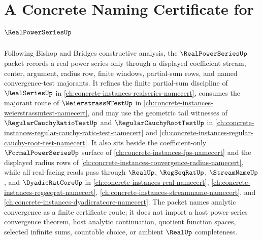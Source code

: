 \chapter{A Concrete Naming Certificate for $\RealPowerSeriesUp$}
\label{ch:concrete-instances-realpowerseries-namecert}

Following Bishop and Bridges constructive analysis, the $\RealPowerSeriesUp$ packet records a real power series only through a displayed coefficient stream, center, argument, radius row, finite windows, partial-sum rows, and named convergence-test majorants. It refines the finite partial-sum discipline of $\RealSeriesUp$ in \autoref{ch:concrete-instances-realseries-namecert}, consumes the majorant route of $\WeierstrassMTestUp$ in \autoref{ch:concrete-instances-weierstrassmtest-namecert}, and may use the geometric tail witnesses of $\RegularCauchyRatioTestUp$ and $\RegularCauchyRootTestUp$ in \autoref{ch:concrete-instances-regular-cauchy-ratio-test-namecert} and \autoref{ch:concrete-instances-regular-cauchy-root-test-namecert}. It also sits beside the coefficient-only $\FormalPowerSeriesUp$ surface of \autoref{ch:concrete-instances-fps-namecert} and the displayed radius rows of \autoref{ch:concrete-instances-convergence-radius-namecert}, while all real-facing reads pass through $\RealUp$, $\RegSeqRatUp$, $\StreamNameUp$, and $\DyadicRatCoreUp$ in \autoref{ch:concrete-instances-real-namecert}, \autoref{ch:concrete-instances-regseqrat-namecert}, \autoref{ch:concrete-instances-streamname-namecert}, and \autoref{ch:concrete-instances-dyadicratcore-namecert}. The packet names analytic convergence as a finite certificate route; it does not import a host power-series convergence theorem, host analytic continuation, quotient function spaces, selected infinite sums, countable choice, or ambient $\RealUp$ completeness.

